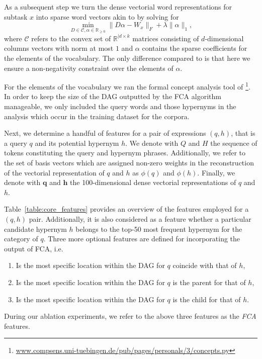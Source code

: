 \documentclass[11pt,a4paper]{article}
\begin{document}
As a subsequent step we turn the dense vectorial word representations for subtask $x$ into
sparse word vectors akin to \citet{Berend:2017} by solving for
\begin{equation}
\min\limits_{D \in \mathcal{C}, \alpha \in \mathbb{R}_{\geq0}} \lVert D\alpha - W_{x} \rVert_F + \lambda \lVert \alpha \rVert_1,
\label{nonneg_SPAMS_objective}
\end{equation}
where $\mathcal{C}$ refers to the convex set of $\mathbb{R}^{\lvert d \times k}$ matrices consisting of $d$-dimensional columns vectors
with norm at most $1$ and $\alpha$ contains the sparse coefficients for the elements of the vocabulary. The only difference
compared to \cite{Berend:2017} is that here we ensure a non-negativity
constraint over the elements of $\alpha$.

For the elements of the vocabulary we ran the formal concept analysis tool of
\citet{Endres:2010}\footnote{\url{www.compsens.uni-tuebingen.de/pub/pages/personals/3/concepts.py}}. In order to keep the size of the DAG outputted by the FCA algorithm manageable, we only included the query words and those hypernyms in the analysis which occur in the training dataset for the corpora.

Next, we determine a handful of features for a pair of expressions $(q, h)$, that is a query $q$ and its potential hypernym $h$. We denote with $Q$ and $H$ the sequence of tokens constituting the query and hypernym phrases. Additionally, we refer to the set of basis vectors which are assigned non-zero weights in the reconstruction of the vectorial representation of $q$ and $h$ as $\phi(q)$ and $\phi(h)$. Finally, we denote with $\mathbf{q}$ and $\mathbf{h}$ the 100-dimensional dense vectorial representations of $q$ and $h$.

Table~\ref{table:core_features} provides an overview of the features employed for a $(q, h)$ pair. Additionally, it is also considered as a feature whether a particular candidate hypernym $h$ belongs to the top-50 most frequent hypernym for the category of $q$. Three more optional features are defined for incorporating the output of FCA, i.e.
\begin{enumerate}
	\item Is the most specific location within the DAG for $q$ coincide with that of $h$,
	\item Is the most specific location within the DAG for $q$ is the parent for that of $h$,
	\item Is the most specific location within the DAG for $q$ is the child for that of $h$.
\end{enumerate}
During our ablation experiments, we refer to the above three features as the \emph{FCA} features.
\end{document}
